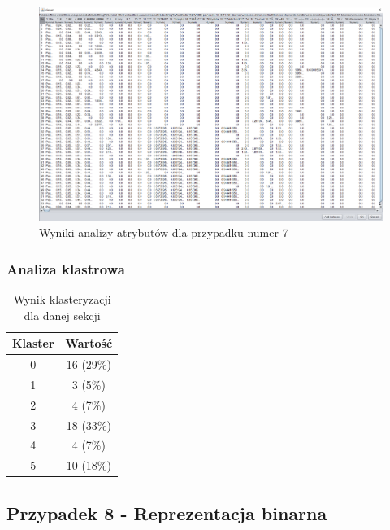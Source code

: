 \documentclass[../EDI_Task2_Karwowski_Kowalewski.tex]{subfiles}
\begin{document}
{{{            \begin{figure}[!htbp]
                \centering
                \includegraphics[width=\textwidth]{img/results1/ftims-case7.png}
                \caption{Wyniki analizy atrybutów dla przypadku numer 7}
            \end{figure}
            \FloatBarrier
        }

        \subsubsection{Analiza klastrowa} {

            \begin{table}[!htbp]
                \small
                \centering
                \begin{tabular}{|c|c|}
                    \hline
                    Klaster & Wartość \\ \hline
                    0   &  16 (29\%) \\
                    1   &   3 (5\%) \\
                    2   &   4 (7\%) \\
                    3   &  18 (33\%) \\
                    4   &   4 (7\%) \\
                    5   &  10 (18\%) \\ \hline
                \end{tabular}
                \caption{Wynik klasteryzacji dla danej sekcji}
            \end{table}
            \FloatBarrier
        }
    }

    \subsection{Przypadek 8 - Reprezentacja binarna} {

}}
\end{document}
